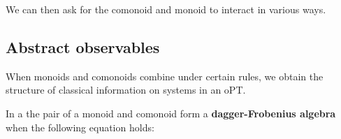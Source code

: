 We can then ask for the comonoid and monoid to interact in various ways.

\subsection{Abstract observables}

When monoids and comonoids combine under certain rules, we obtain the structure of classical information on systems in an oPT.

\begin{defn}
\label{def:frobenius}
In a \dsmc the pair of a monoid  and comonoid  form a \textbf{dagger-Frobenius algebra} when the following equation holds:
\begin{equation}
\label{eq:frobenius}

\end{equation}
\end{defn}

